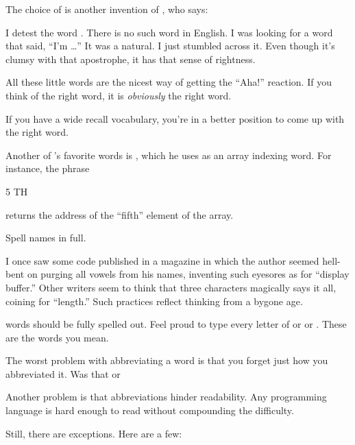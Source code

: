%
\begin{interview}
The choice of  is another invention of , who
says:

\begin{tfquot}
I detest the word . There is no such word in English.  I
was looking for a word that said, ``I'm \dots{}'' It was a natural.
I just stumbled across it.  Even though it's clumsy with that
apostrophe, it has that sense of rightness.

All these little words are the nicest way of getting the ``Aha!''
reaction.  If you think of the right word, it is \emph{obviously} the
right word.

If you have a wide recall vocabulary, you're in a better position to
come up with the right word.
\end{tfquot}
\end{interview}%
Another of 's favorite words is , which he
uses as an array indexing word.  For instance, the phrase
\begin{Code}
5 TH
\end{Code}
returns the address of the ``fifth'' element of the array.%

%
\begin{tip}
Spell names in full.
\end{tip}
I once saw some \Forth{} code published in a magazine in which the
author seemed hell-bent on purging all vowels from his names,
inventing such eyesores as  for ``display buffer.''
Other writers seem to think that three characters magically says it
all, coining  for ``length.'' Such practices reflect
thinking from a bygone age.

%
\Forth{} words should be fully spelled out.  Feel proud to type every
letter of  or  or .
These are the words you mean.

The worst problem with abbreviating a word is that you forget just
how you abbreviated it.  Was that  or 

Another problem is that abbreviations hinder readability.
Any programming language is hard enough to read without compounding
the difficulty.

Still, there are exceptions.  Here are a few:

